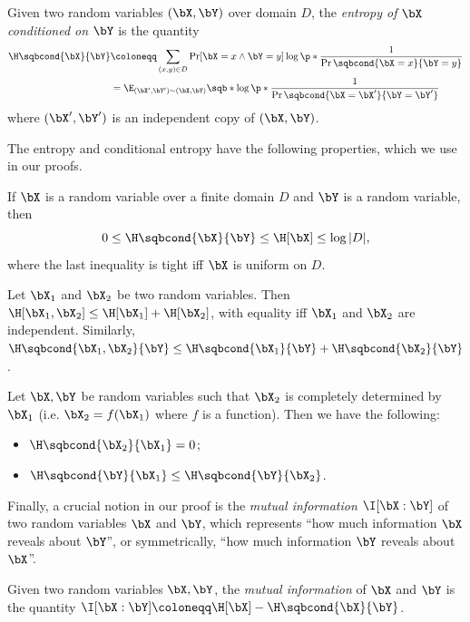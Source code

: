 \begin{definition}
Given two random variables $(\bX, \bY)$ over domain $D$, the \emph{entropy of $\bX$ conditioned on $\bY$}
is the quantity
\begin{align*}
\H\sqbcond{\bX}{\bY}
&\coloneqq \sum_{(x,y) \in D} \Pr[\bX = x \wedge \bY = y] \log \p*{\frac{1}{\Pr\sqbcond{\bX = x}{\bY = y}}}\\
&= \E_{(\bX',\bY') \sim (\bX,\bY)} \sqb*{\log\p*{\frac{1}{\Pr\sqbcond{\bX = \bX'}{\bY = \bY'}}}}
\end{align*}
where $(\bX',\bY')$ is an independent copy of $(\bX, \bY)$.
\end{definition}

The entropy and conditional entropy have the following properties, which we use in our proofs.

\begin{fact}[bounds]
If $\bX$ is a random variable over a finite domain $D$ and $\bY$ is a random variable, then
\[
0 \leq \H\sqbcond{\bX}{\bY} \leq \H[\bX] \leq \log |D|,
\]
where the last inequality is tight iff $\bX$ is uniform on $D$.
\end{fact}

\begin{fact}[subadditivity]
Let $\bX_1$ and $\bX_2$ be two random variables. Then $\H[\bX_1, \bX_2] \leq \H[\bX_1] + \H[\bX_2]$, with equality iff $\bX_1$ and $\bX_2$ are independent.
Similarly, $\H\sqbcond{\bX_1, \bX_2}{\bY} \leq \H\sqbcond{\bX_1}{\bY} + \H\sqbcond{\bX_2}{\bY}$.
\end{fact}

\begin{fact}[dependence]
Let $\bX, \bY$ be random variables such that $\bX_2$ is completely determined by $\bX_1$ (i.e. $\bX_2 = f(\bX_1)$ where $f$ is a function). Then we have the following:
\begin{itemize}
    \item $\H\sqbcond{\bX_2}{\bX_1} = 0$;
    \item $\H\sqbcond{\bY}{\bX_1} \leq \H\sqbcond{\bY}{\bX_2}$.
\end{itemize}
\end{fact}

Finally, a crucial notion in our proof is the \emph{mutual information} $\I[\bX:\bY]$ of two random variables $\bX$ and $\bY$, which represents ``how much information $\bX$ reveals about $\bY$'', or symmetrically, ``how much information $\bY$ reveals about $\bX$''.
\begin{definition}
Given two random variables $\bX, \bY$, the \emph{mutual information} of $\bX$ and $\bY$
is the quantity $\I[\bX:\bY] \coloneqq \H[\bX] - \H\sqbcond{\bX}{\bY}$.
\end{definition}

